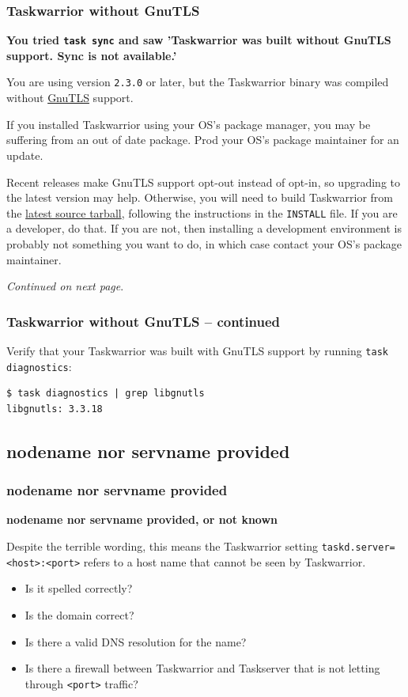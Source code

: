\documentclass[t,handout]{beamer}
\begin{document}
\begin{frame}[fragile]\frametitle{Taskwarrior without GnuTLS}
    \textbf{You tried \texttt{task sync} and saw 'Taskwarrior was built without GnuTLS support.  Sync is not available.'}

    You are using version \verb+2.3.0+ or later, but the Taskwarrior binary was compiled without \href{http://www.gnutls.org}{GnuTLS} support.

    If you installed Taskwarrior using your OS's package manager, you may be suffering from an out of date package. Prod your OS's package maintainer for an update.

    Recent releases make GnuTLS support opt-out instead of opt-in, so upgrading to the latest version may help. Otherwise, you will need to build Taskwarrior from the \href{http://taskwarrior.org/download/task-latest.tar.gz}{latest source tarball}, following the instructions in the \verb+INSTALL+ file. If you are a developer, do that. If you are not, then installing a development environment is probably not something you want to do, in which case contact your OS's package maintainer.

    \emph{Continued on next page}.
\end{frame}

\begin{frame}[fragile]\frametitle{Taskwarrior without GnuTLS -- continued}
    Verify that your Taskwarrior was built with GnuTLS support by running \verb+task diagnostics+:

    \begin{lstlisting}
$ task diagnostics | grep libgnutls
libgnutls: 3.3.18\end{lstlisting}
\end{frame}

\subsection{nodename nor servname provided}

\begin{frame}[fragile]\frametitle{nodename nor servname provided}
    \textbf{nodename nor servname provided, or not known}

    Despite the terrible wording, this means the Taskwarrior setting \verb+taskd.server=<host>:<port>+ refers to a host name that cannot be seen by Taskwarrior.

    \begin{itemize}
        \item Is it spelled correctly?
        \item Is the domain correct?
        \item Is there a valid DNS resolution for the name?
        \item Is there a firewall between Taskwarrior and Taskserver that is not letting through \verb+<port>+ traffic?
    \end{itemize}
\end{frame}
\end{document}
